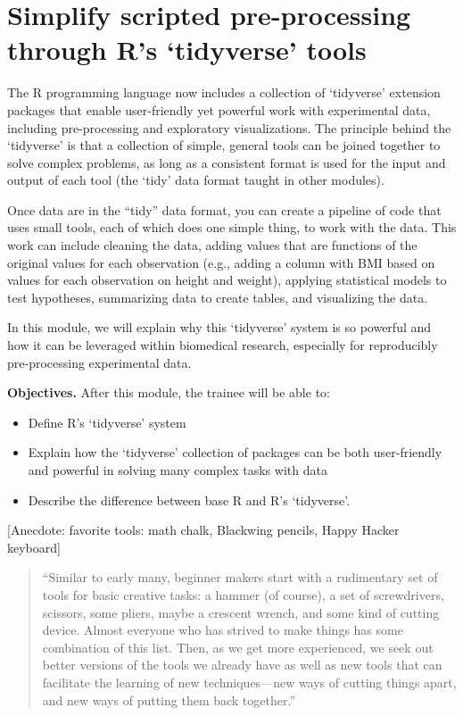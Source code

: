 \documentclass[]{tufte-book}
\providecommand{\tightlist}{%
  \setlength{\itemsep}{0pt}\setlength{\parskip}{0pt}}
\begin{document}
\section{Simplify scripted pre-processing through R's `tidyverse' tools}\label{module14}

The R programming language now includes a collection of `tidyverse' extension
packages that enable user-friendly yet powerful work with experimental data,
including pre-processing and exploratory visualizations. The principle behind
the `tidyverse' is that a collection of simple, general tools can be joined
together to solve complex problems, as long as a consistent format is used for
the input and output of each tool (the `tidy' data format taught in other
modules).

Once data are in the ``tidy'' data format, you can create a pipeline of code that
uses small tools, each of which does one simple thing, to work with the data.
This work can include cleaning the data, adding values that are functions of the
original values for each observation (e.g., adding a column with BMI based on
values for each observation on height and weight), applying statistical models to
test hypotheses, summarizing data to create tables, and visualizing the data.

In this module, we will explain why this `tidyverse' system is so
powerful and how it can be leveraged within biomedical research, especially for
reproducibly pre-processing experimental data.

\textbf{Objectives.} After this module, the trainee will be able to:

\begin{itemize}
\tightlist
\item
  Define R's `tidyverse' system
\item
  Explain how the `tidyverse' collection of packages can be both user-friendly
  and powerful in solving many complex tasks with data
\item
  Describe the difference between base R and R's `tidyverse'.
\end{itemize}

{[}Anecdote: favorite tools: math chalk, Blackwing pencils, Happy Hacker keyboard{]}

\begin{quote}
``Similar to early many, beginner makers start with a rudimentary set of tools for
basic creative tasks: a hammer (of course), a set of screwdrivers, scissors,
some pliers, maybe a crescent wrench, and some kind of cutting device. Almost
everyone who has strived to make things has some combination of this list. Then,
as we get more experienced, we seek out better versions of the tools we already
have as well as new tools that can facilitate the learning of new techniques---new
ways of cutting things apart, and new ways of putting them back together.'' \citep{savage2020every}
\end{quote}
\end{document}
